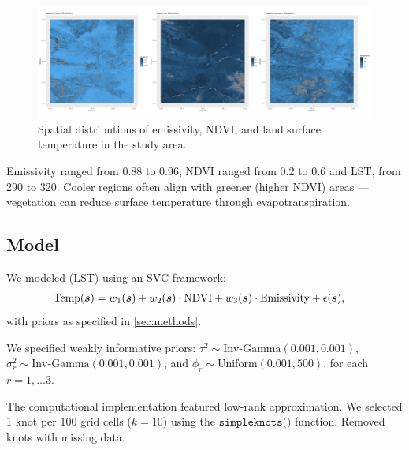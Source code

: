  \begin{figure}[H]
 \centering
 \includegraphics[width=\textwidth]{../../figures/spatial_horizontal_stack.png}
 \caption{
   Spatial distributions of emissivity, NDVI, and  land surface temperature in the study area. 
 }
 \label{fig:spatialpatterns}
 \end{figure}
 
  Emissivity ranged from 0.88 to 0.96, NDVI ranged from 0.2 to 0.6  and LST, from 290 to 320.  
 Cooler regions often align with greener (higher NDVI) areas — vegetation can reduce surface temperature through evapotranspiration.
\subsection{Model}
We modeled (LST) using an SVC framework:
\begin{align*}
\text{Temp}(\boldsymbol{s}) &= w_1(\boldsymbol{s}) + w_2(\boldsymbol{s})\cdot\text{NDVI} + w_3(\boldsymbol{s})\cdot\text{Emissivity} + \epsilon(\boldsymbol{s}),
\end{align*}
with priors as specified in \ref{sec:methods}.

We specified weakly informative priors: $\tau^2 \sim \text{Inv-Gamma}(0.001, 0.001)$, \newline $\sigma_r^2 \sim \text{Inv-Gamma}(0.001, 0.001)$, and $\phi_r \sim \text{Uniform}(0.001, 500)$, for each $r = 1, \dots 3$.

The computational implementation featured low-rank approximation. We selected 1 knot per 100 grid cells ($k=10$) using the  $\texttt{simpleknots()}$ function. Removed knots with missing data.
